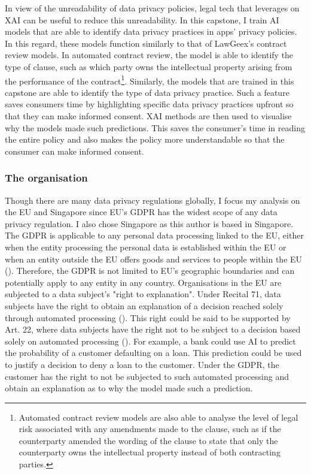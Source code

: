 In view of the unreadability of data privacy policies, legal tech that leverages on XAI can be useful to reduce this unreadability. In this capstone, I train AI models that are able to identify data privacy practices in apps' privacy policies. In this regard, these models function similarly to that of LawGeex's contract review models. In automated contract review, the model is able to identify the type of clause, such as which party owns the intellectual property arising from the performance of the contract\footnote{Automated contract review models are also able to analyse the level of legal risk associated with any amendments made to the clause, such as if the counterparty amended the wording of the clause to state that only the counterparty owns the intellectual property instead of both contracting parties.}. Similarly, the models that are trained in this capstone are able to identify the type of data privacy practice. Such a feature saves consumers time by highlighting specific data privacy practices upfront so that they can make informed consent. XAI methods are then used to visualise why the models made such predictions. This saves the consumer's time in reading the entire policy and also makes the policy more understandable so that the consumer can make informed consent.

\subsubsection{The organisation}
Though there are many data privacy regulations globally, I focus my analysis on the EU and Singapore since EU's GDPR has the widest scope of any data privacy regulation. I also chose Singapore as this author is based in Singapore. The GDPR is applicable to any personal data processing linked to the EU, either when the entity processing the personal data is established within the EU or when an entity outside the EU offers goods and services to people within the EU (\cite{gdpr_art3}). Therefore, the GDPR is not limited to EU's geographic boundaries and can potentially apply to any entity in any country. Organisations in the EU are subjected to a data subject's "right to explanation". Under Recital 71, data subjects have the right to obtain an explanation of a decision reached solely through automated processing (\cite{gdpr_recital71}). This right could be said to be supported by Art. 22, where data subjects have the right not to be subject to a decision based solely on automated processing (\cite{gdpr_art22}). For example, a bank could use AI to predict the probability of a customer defaulting on a loan. This prediction could be used to justify a decision to deny a loan to the customer. Under the GDPR, the customer has the right to not be subjected to such automated processing and obtain an explanation as to why the model made such a prediction.

